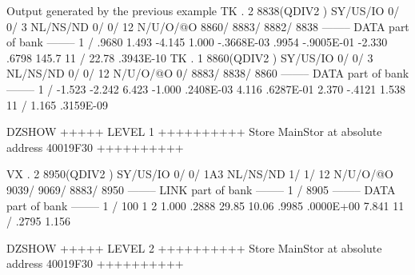 \begin{Listing}{Output generated by the previous example}
 TK  .     2     8838(QDIV2   ) SY/US/IO    0/    0/   3 NL/NS/ND    0/    0/      12 N/U/O/@O    8860/    8883/    8882/    8838
--------  DATA part of bank  --------                                                                                            
      1 /   .9680       1.493      -4.145       1.000      -.3668E-03   .9954      -.9005E-01  -2.330       .6798       145.7    
     11 /   22.78       .3943E-10                                                                                                
 TK  .     1     8860(QDIV2   ) SY/US/IO    0/    0/   3 NL/NS/ND    0/    0/      12 N/U/O/@O       0/    8883/    8838/    8860
--------  DATA part of bank  --------                                                                                            
      1 /  -1.523      -2.242       6.423      -1.000       .2408E-03   4.116       .6287E-01   2.370      -.4121       1.538    
     11 /   1.165       .3159E-09                                                                                                
                                                                                                                                 
DZSHOW  +++++ LEVEL     1 ++++++++++            Store  MainStor at absolute address 40019F30      ++++++++++                     
                                                                                                                                 
 VX  .     2     8950(QDIV2   ) SY/US/IO    0/    0/ 1A3 NL/NS/ND    1/    1/      12 N/U/O/@O    9039/    9069/    8883/    8950
--------  LINK part of bank  --------                                                                                            
      1 /        8905                                                                                                            
--------  DATA part of bank  --------                                                                                            
      1 /         100           1           2   1.000       .2888       29.85       10.06       .9985       .0000E+00   7.841    
     11 /   .2795       1.156                                                                                                    
                                                                                                                                 
DZSHOW  +++++ LEVEL     2 ++++++++++            Store  MainStor at absolute address 40019F30      ++++++++++                     
                                                                                                                                 

\end{Listing}
